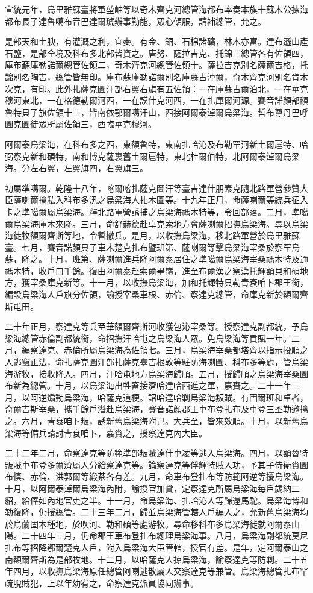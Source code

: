 \begin{pinyinscope}
宣統元年，烏里雅蘇臺將軍堃岫等以奇木齊克河總管海都布率奏本旗十蘇木公揀海都布長子達魯噶布音巴達爾琥辦事勤能，眾心傾服，請補總管，允之。

是部天和土腴，有灌溉之利，宜麥。有金、銅、石棉諸礦，林木亦富。達布遜山產石鹽，是部全境及科布多北部皆資之。唐努、薩拉吉克、托錦三總管各有佐領四，庫布蘇庫勒諾爾總管佐領二，奇木齊克河總管佐領十。薩拉吉克別名薩爾吉格，托錦別名陶吉，總管皆無印。庫布蘇庫勒諾爾別名庫蘇古淖爾，奇木齊克河別名肯木次克，有印。此外扎薩克圖汗部右翼右旗有五佐領：一在庫蘇古爾泊北，一在華克穆河東北，一在格德勒爾河西，一在謨什克河西，一在扎庫爾河源。賽音諾顏部額魯特貝子旗佐領十三，皆南依鄂爾噶汗山，西接阿爾泰淖爾烏梁海。哲布尊丹巴呼圖克圖徒眾所屬佐領三，西臨華克穆河。

阿爾泰烏梁海，在科布多之西，東額魯特，東南扎哈沁及布勒罕河新土爾扈特、哈弼察克新和碩特，南和博克薩裏舊土爾扈特，東北杜爾伯特，北阿爾泰淖爾烏梁海。分左右翼，左翼旗四，右翼旗三。

初屬準噶爾。乾隆十八年，喀爾喀扎薩克圖汗等臺吉達什朋素克隨北路軍營參贊大臣薩喇爾擒私入科布多汛之烏梁海人扎木圖等。十九年正月，命薩喇爾等統兵征入卡之準噶爾屬烏梁海。釋北路軍營誘捕之烏梁海禡木特等，令回部落。二月，準噶爾烏梁海庫木來降。三月，命舒赫德赴卓克索地方會薩喇爾招撫烏梁海。尋以烏梁海徙牧額爾齊斯等地，令暫撤兵。是月，以收撫烏梁海，移北路軍營於烏里雅蘇臺。七月，賽音諾顏貝子車木楚克扎布暨班第、薩喇爾等擊烏梁海宰桑於察罕烏蘇，降之。十月，班第、薩喇爾進兵降阿爾泰居住之準噶爾烏梁海宰桑禡木特及通禡木特，收戶口千餘。復由阿爾泰赴索爾畢嶺，進至布爾漢之察漢托輝額貝和碩地方，獲宰桑庫克新等。十一月，以收撫烏梁海，加和托輝特貝勒青袞咱卜郡王銜，編設烏梁海人戶旗分佐領，諭授宰桑車根、赤倫、察達克總管，命庫克新於額爾齊斯屯田。

二十年正月，察達克等兵至華額爾齊斯河收獲包沁宰桑等。授察達克副都統，予烏梁海總管赤倫副都統銜，命招撫汗哈屯之烏梁海人眾。免烏梁海等貢賦一年。二月，編察達克、赤倫所屬烏梁海為佐領七。三月，烏梁海宰桑都塔齊以指示投順之人逃竄正法，命扎薩克圖汗部扎薩克臺吉根敦等駐防海喇圖、科布多等處，管烏梁海游牧，接收降人。四月，汗哈屯地方烏梁海歸順。五月，授歸順之烏梁海宰桑圖布新為總管。十月，以烏梁海出牲畜接濟哈達哈西進之軍，嘉賚之。二十一年三月，以阿逆煽動烏梁海，哈薩克道梗。詔哈達哈剿烏梁海叛賊。有固爾班和卓者，奇爾吉斯宰桑，攜千餘戶潛赴烏梁海，賽音諾顏郡王車布登扎布及車登三丕勒邀擒之。六月，青袞咱卜叛，誘新舊烏梁海附己。大兵至，皆來效順。十月，以新舊烏梁海等備兵請討青袞咱卜，嘉賚之，授察達克內大臣。

二十二年二月，命察達克等防範準部叛賊達什車凌等逃入烏梁海。四月，以額魯特叛賊車布登多爾濟屬人分給察達克等。論察達克等俘輝特賊人功，予其子侍衛賚圖布慎、赤倫、洪郭爾等緞茶各有差。九月，命車布登扎布等防範阿逆等擾烏梁海。十月，以阿爾泰淖爾烏梁海內附，諭授官加賞，定察達克所屬烏梁海每戶歲納二貂，給俸如內地官吏之半。十一月，命烏梁海、扎哈沁人等歸還馬駝。烏梁海博和勒復降，仍授總管。二十三年二月，歸並烏梁海管轄人戶編入之，允新舊烏梁海均於烏蘭固木種地，於吹河、勒和碩等處游牧。尋命移科布多烏梁海徙就阿爾泰山陽。二十四年三月，仍命郡王車布登扎布總理烏梁海事。八月，烏梁海副都統莫尼扎布等招降鄂爾楚克人戶，附入烏梁海大臣管轄，授官有差。是年，定阿爾泰山之南額爾齊斯為是部牧地。十二月，以哈薩克人掠烏梁海，諭察達克等防剿。二十五年四月，以收撫烏梁海原任總管阿喇逃散屬人交察達克等兼管。烏梁海總管扎布罕疏脫賊犯，上以年幼宥之，命察達克派員協同辦事。


\end{pinyinscope}
